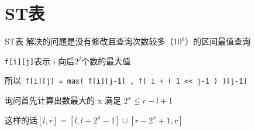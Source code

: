 \section{ST表}

ST表 解决的问题是没有修改且查询次数较多（$10^6$）的区间最值查询

\verb|f[i][j]|表示 i 向后$2^j$个数的最大值

所以\verb| f[i][j] = max( f[i][j-1] , f[ i + ( 1 << j-1 ) ][j-1] |

询问首先计算出数最大的 x 满足 $2^x \le r-l+1 $

这样的话$[l,r]=[l,l+2^x-1 ]\cup[r-2^x+1,r]$


